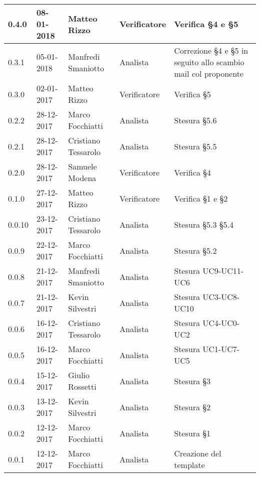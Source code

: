 \documentclass[./AnalisideiRequisiti.tex]{subfiles}
\begin{document}
{\begin{longtable}{|p{20mm}|p{20mm}|p{40mm}|p{30mm}|p{50mm}|}
		0.4.0 & 08-01-2018 & Matteo Rizzo & Verificatore & Verifica §4 e §5\\ \hline
		0.3.1 & 05-01-2018 & Manfredi Smaniotto & Analista & Correzione §4 e §5 in seguito allo scambio mail col proponente \\ \hline		
		0.3.0 & 02-01-2017 & Matteo Rizzo & Verificatore & Verifica §5\\ \hline
		0.2.2 & 28-12-2017 & Marco Focchiatti & Analista & Stesura §5.6\\ \hline	
		0.2.1 & 28-12-2017 & Cristiano Tessarolo & Analista & Stesura §5.5\\ \hline
	   	0.2.0 & 28-12-2017 & Samuele Modena & Verificatore & Verifica §4\\ \hline
	   	0.1.0 & 27-12-2017 & Matteo Rizzo & Verificatore & Verifica §1 e §2  \\ \hline		
		0.0.10 & 23-12-2017 & Cristiano Tessarolo & Analista & Stesura §5.3 §5.4\\ \hline		
		0.0.9 & 22-12-2017 & Marco Focchiatti & Analista & Stesura §5.2 \\ \hline		
		0.0.8 & 21-12-2017 & Manfredi Smaniotto & Analista & Stesura UC9-UC11-UC6\\ \hline
		0.0.7 & 21-12-2017 & Kevin Silvestri & Analista & Stesura UC3-UC8-UC10\\ \hline
		0.0.6 & 16-12-2017 & Cristiano Tessarolo & Analista & Stesura UC4-UC0-UC2\\ \hline
		0.0.5 & 16-12-2017 & Marco Focchiatti & Analista & Stesura UC1-UC7-UC5\\ \hline
		0.0.4 & 15-12-2017 & Giulio Rossetti & Analista & Stesura §3\\ \hline
		0.0.3 & 13-12-2017 & Kevin Silvestri & Analista & Stesura §2\\ \hline
		0.0.2 & 12-12-2017 & Marco Focchiatti & Analista & Stesura §1\\ \hline
		0.0.1 & 12-12-2017 & Marco Focchiatti & Analista & Creazione del template\\ \hline
	\end{longtable}

}	
\end{document}
